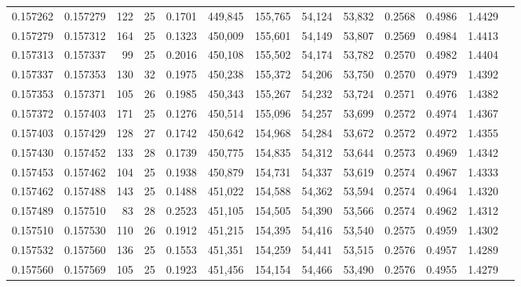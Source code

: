 \begin{tabular}{rrrrrrrrrrrrr}
0.157262 & 0.157279 & 122 &  25 &                                     0.1701 & 449,845 & 155,765 &  54,124 &  53,832 & 0.2568 & 0.4986 & 1.4429 \\
0.157279 & 0.157312 & 164 &  25 &                                     0.1323 & 450,009 & 155,601 &  54,149 &  53,807 & 0.2569 & 0.4984 & 1.4413 \\
0.157313 & 0.157337 &  99 &  25 &                                     0.2016 & 450,108 & 155,502 &  54,174 &  53,782 & 0.2570 & 0.4982 & 1.4404 \\
0.157337 & 0.157353 & 130 &  32 &                                     0.1975 & 450,238 & 155,372 &  54,206 &  53,750 & 0.2570 & 0.4979 & 1.4392 \\
0.157353 & 0.157371 & 105 &  26 &                                     0.1985 & 450,343 & 155,267 &  54,232 &  53,724 & 0.2571 & 0.4976 & 1.4382 \\
0.157372 & 0.157403 & 171 &  25 &                                     0.1276 & 450,514 & 155,096 &  54,257 &  53,699 & 0.2572 & 0.4974 & 1.4367 \\
0.157403 & 0.157429 & 128 &  27 &                                     0.1742 & 450,642 & 154,968 &  54,284 &  53,672 & 0.2572 & 0.4972 & 1.4355 \\
0.157430 & 0.157452 & 133 &  28 &                                     0.1739 & 450,775 & 154,835 &  54,312 &  53,644 & 0.2573 & 0.4969 & 1.4342 \\
0.157453 & 0.157462 & 104 &  25 &                                     0.1938 & 450,879 & 154,731 &  54,337 &  53,619 & 0.2574 & 0.4967 & 1.4333 \\
0.157462 & 0.157488 & 143 &  25 &                                     0.1488 & 451,022 & 154,588 &  54,362 &  53,594 & 0.2574 & 0.4964 & 1.4320 \\
0.157489 & 0.157510 &  83 &  28 &                                     0.2523 & 451,105 & 154,505 &  54,390 &  53,566 & 0.2574 & 0.4962 & 1.4312 \\
0.157510 & 0.157530 & 110 &  26 &                                     0.1912 & 451,215 & 154,395 &  54,416 &  53,540 & 0.2575 & 0.4959 & 1.4302 \\
0.157532 & 0.157560 & 136 &  25 &                                     0.1553 & 451,351 & 154,259 &  54,441 &  53,515 & 0.2576 & 0.4957 & 1.4289 \\
0.157560 & 0.157569 & 105 &  25 &                                     0.1923 & 451,456 & 154,154 &  54,466 &  53,490 & 0.2576 & 0.4955 & 1.4279 \\

\end{tabular}

